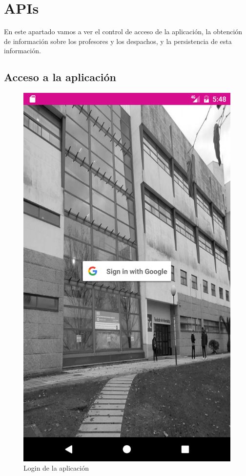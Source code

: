 \documentclass[12pt, a4paper, titlepage]{article}
\begin{document}
	\section{APIs}
	En este apartado vamos a ver el control de acceso de la aplicación, la obtención de información sobre los profesores y los despachos, y la persistencia de esta información.
	
	\subsection{Acceso a la aplicación}
		\begin{figure}[h!]
		\begin{center}
			\includegraphics[scale=0.15]{img/login.png}
			\caption{Login de la aplicación}
		\end{center}
	\end{figure}
	
\end{document}
